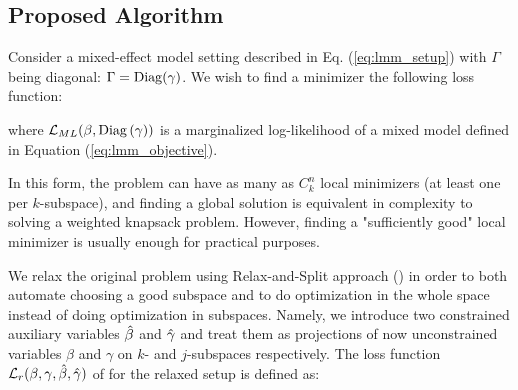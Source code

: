 \documentclass[11pt,letterpaper]{article}
\numberwithin{equation}{section} %
\numberwithin{figure}{section} %
\numberwithin{table}{section} %
\begin{document}

\subsection{Proposed Algorithm}
\label{ch:proposed_algorithm}

Consider a mixed-effect model setting described in Eq. (\ref{eq:lmm_setup}) with $\Gamma$ being diagonal: $\Gamma = \operatorname{Diag}(\gamma)$.  We wish to find a minimizer the following loss function: 


where $\operatorname{\mathcal{L}}_{ML}(\beta, \operatorname{Diag}{(\gamma)})$ is a marginalized log-likelihood of a mixed model defined in Equation (\ref{eq:lmm_objective}). 

In this form, the problem can have as many as $C^n_k$ local minimizers (at least one per $k$-subspace), and finding a global solution is equivalent in complexity to solving a weighted knapsack problem. However, finding a "sufficiently good" local minimizer is usually enough for practical purposes.

We relax the original problem using Relax-and-Split approach (\cite{Zheng2018RelaxAndSplit}) in order to both automate choosing a good subspace and to do optimization in the whole space instead of doing optimization in subspaces. Namely, we introduce two constrained auxiliary variables $\hat\beta$ and $\hat\gamma$ and treat them as projections of now unconstrained variables $\beta$ and $\gamma$ on $k$- and $j$-subspaces respectively. The loss function $\operatorname{\mathcal{L}}_r(\beta, \gamma, \hat\beta, \hat\gamma)$ of for the relaxed setup is defined as:
\end{document}
